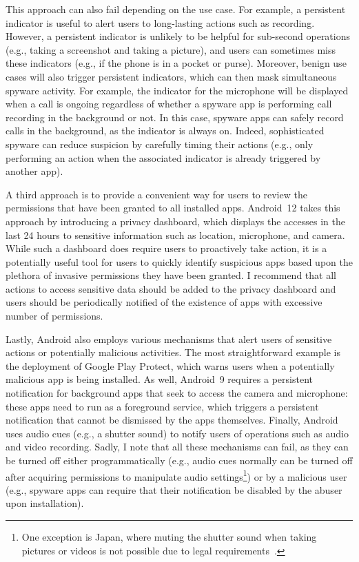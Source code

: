 This approach can also fail depending on the use case.  For example, a
persistent indicator is useful to alert users to long-lasting actions
such as recording. However, a persistent indicator is unlikely to be
helpful for sub-second operations (e.g., taking a screenshot and
taking a picture),
and users can sometimes miss these indicators (e.g., if the phone is
in a pocket or purse).  Moreover, benign use cases will also trigger
persistent indicators, which can then mask simultaneous spyware activity.  For example, the indicator for the microphone will be
displayed when a call is ongoing regardless of whether a spyware app
is performing call recording in the background or not.  In this case,
spyware apps can safely record calls in the background, as the
indicator is always on.  Indeed, sophisticated spyware can reduce
suspicion by carefully timing their actions (e.g., only performing an
action when the associated indicator is already triggered by another
app).

A third approach is to provide a convenient way for users to review the
permissions that have been granted to all installed apps.  Android~12 takes this
approach by introducing a privacy dashboard, which displays the
accesses in the last 24 hours to sensitive information such as location, microphone, and camera.
While such a dashboard does require users to proactively
take action, it is a potentially useful tool for users to quickly identify
suspicious apps based upon the plethora of invasive permissions they have been
granted. I
recommend that all actions to access sensitive data should be added to the
privacy dashboard and users should be periodically notified of the existence of apps with excessive number of permissions.

Lastly, Android also employs various mechanisms that alert users of sensitive actions or potentially malicious activities. 
The most straightforward example is the deployment of Google Play Protect, which warns users when a potentially malicious app is being installed. As well, Android~9 requires a persistent notification for background apps that seek to access the camera and microphone: these apps need to run as a foreground service, which triggers a persistent notification that cannot be dismissed by the apps themselves. Finally, Android uses audio cues (e.g., a shutter sound) to notify users of operations such as audio and video recording. Sadly, I note that all these mechanisms can fail, as they can be turned off either programmatically (e.g., audio cues normally can be
turned off after acquiring permissions to manipulate audio
settings\footnote{One exception is Japan, where muting the shutter sound when
taking pictures or videos is not possible due to legal
requirements~\cite{HowcanIt38:online}.}) or by a malicious user (e.g., spyware apps can require that their notification be disabled by the abuser upon installation).


